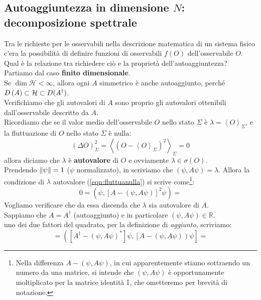 \subsection{Autoaggiuntezza in dimensione $N$: decomposizione spettrale}
Tra le richieste per le osservabili nella descrizione matematica di un sistema fisico c'era la possibilità di definire funzioni di osservabili $f(O)$ dell'osservabile $O$. Qual è la relazione tra richiedere ciò e la proprietà dell'autoaggiuntezza?\\

Partiamo dal caso \textbf{finito dimensionale}.\\
Se $\dim{\mathcal{H}<\infty}$, allora ogni $A$ simmetrico è anche autoaggiunto, perché $D\left(A\right)\subset \mathcal{H} \subset D(A^\dag)$.\\
Verifichiamo che gli autovalori di $A$ sono proprio gli autovalori ottenibili dall'osservabile descritto da $A$.\\
Ricordiamo che se il valor medio dell'osservabile $O$ nello stato $\Sigma$ è $\lambda=\left\langle O\right\rangle_\Sigma$, e la fluttuazione di $O$ nello stato $\Sigma$ è nulla:
\begin{equation}
\left(\Delta O\right)_\Sigma^2=\left\langle\left(O-\left\langle O\right\rangle_\Sigma\right)^2\right\rangle_\Sigma=0
\label{eqn:fluttuanulla}
\end{equation}
allora diciamo che $\lambda$ è \textbf{autovalore} di $O$ e ovviamente  $\lambda \in \sigma \left(O\right)$.\\
Prendendo $\left\lVert\psi\right\rVert=1$ ($\psi$ normalizzato), in \MQ scriviamo che $(\psi,A\psi) = \lambda$. Allora la condizione di $\lambda$ autovalore (\ref{eqn:fluttuanulla}) si scrive come\footnote{Nella differenza $A-(\psi,A\psi)$, in cui apparentemente stiamo sottraendo un numero da una matrice, si intende che $(\psi,A\psi)$ è opportunamente moltiplicato per la matrice identità $\mathbb{I}$, che ometteremo per brevità di notazione.}:
\[
0=\left(\psi, \left[A-\left(\psi,A\psi\right)\right]^2\psi\right) =
\]
Vogliamo verificare che da essa discenda che $\lambda$ sia autovalore di $A$.\\
Sappiamo che $A=A^\dag$ (autoaggiunto) e in particolare $\left(\psi,A\psi\right)\in\mathbb{R}$.\\
 uno dei due fattori del quadrato, per la definizione di \textit{aggiunto}, scriviamo:
\[
=\left(\left[A^\dag-\left(\psi,A\psi\right)^*\right]\psi, \left[A-\left(\psi,A\psi\right)\right)\psi\right]=
\]
